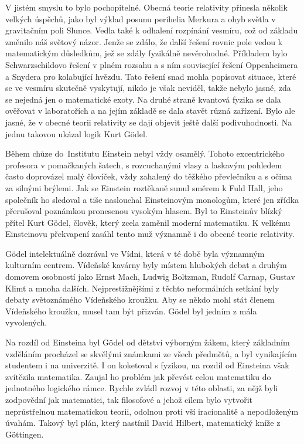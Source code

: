   V jistém smyslu to bylo pochopitelné. Obecná teorie relativity přinesla několik velkých úspěchů,
  jako byl výklad posunu perihelia Merkura a ohyb světla v gravitačním poli Slunce. Vedla také k
  odhalení rozpínání vesmíru, což od základu změnilo náš světový názor. Jenže se zdálo, že další
  řešení rovnic pole vedou k matematickým důsledkům, jež se zdály fyzikálně nevěrohodné. Příkladem
  bylo Schwarzschildovo řešení v plném rozsahu a s ním související řešení Oppenheimera a Snydera pro
  kolabující hvězdu. Tato řešení snad mohla popisovat situace, které se ve vesmíru skutečně
  vyskytují, nikdo je však neviděl, takže nebylo jasné, zda se nejedná jen o matematické exoty. Na
  druhé straně kvantová fyzika se dala ověřovat v laboratořích a na jejím základě se dala stavět
  různá zařízení. Bylo ale jasné, že v obecné teorii relativity se dají objevit ještě další
  podivuhodnosti. Na jednu takovou ukázal logik Kurt Gödel. 
  
  Během chůze do Institutu Einstein nebyl vždy osamělý. Tohoto excentrického profesora v pomačkaných
  šatech, s rozcuchanými vlasy a laskavým pohledem často doprovázel malý človíček, vždy zahalený do
  těžkého převlečníku a s očima za silnými brýlemi. Jak se Einstein roztěkaně sunul směrem k Fuld
  Hall, jeho společník ho sledoval a tiše naslouchal Einsteinovým monologům, které jen zřídka
  přerušoval poznámkou pronesenou vysokým hlasem. Byl to Einsteinův blízký přítel Kurt Gödel,
  člověk, který zcela zaměnil moderní matematiku. K velkému Einsteinovu překvapení zasáhl tento muž
  významně i do obecné teorie relativity. 
  
  Gödel intelektuálně dozrával ve Vídni, která v té době byla významným kulturním centrem. Vídeňské
  kavárny byly místem hlubokých debat a druhým domovem osobností jako Ernst Mach, Ludwig Boltzman,
  Rudolf Carnap, Gustav Klimt a mnoha dalších. Nejprestižnějšími z těchto neformálních setkání byly
  debaty světoznámého Vídeňského kroužku. Aby se někdo mohl stát členem Vídeňského kroužku, musel
  tam být přizván. Gödel byl jedním z mála vyvolených. 
  
  Na rozdíl od Einsteina byl Gödel od dětství výborným žákem, který základním vzděláním procházel se
  skvělými známkami ze všech předmětů, a byl vynikajícím studentem i na univerzitě. I on koketoval s
  fyzikou, na rozdíl od Einsteina však zvítězila matematika. Zaujal ho problém jak převést celou
  matematiku do jednotného logického rámce. Rychle zvládl rozvoj v této oblasti, za nějž byli
  zodpovědní jak matematici, tak filosofové a jehož cílem bylo vytvořit neprůstřelnou matematickou
  teorii, odolnou proti vší iracionalitě a nepodloženým úvahám. Takový byl plán, který nastínil
  David Hilbert, matematický kníže z Göttingen. 
  

